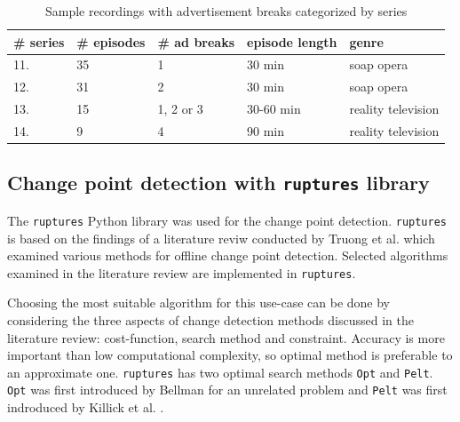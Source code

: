 \begin{table}[h]
    \begin{center}
    \begin{tabular}{|p{15mm}|p{20mm}|p{22mm}|p{28mm}|p{30mm}|} %
        \hline
        \textbf{\# series} & \textbf{\# episodes} & \textbf{\# ad breaks} & \textbf{episode length} & \textbf{genre}  \\ \hline
        11. & 35 & 1 & 30 min & soap opera\\ \hline
        12. & 31 & 2 & 30 min & soap opera\\ \hline
        13. & 15 & 1, 2 or 3 & 30-60 min & reality television\\ \hline
        14. &  9 & 4 & 90 min & reality television\\ \hline
    \end{tabular}
    \end{center}
    \caption{Sample recordings with advertisement breaks categorized by series}
    \label{tab:data_ads}
\end{table}

\subsection{Change point detection with \texttt{ruptures} library} \label{subsec:solution}

The \texttt{ruptures} Python library was used for the change point detection. \texttt{ruptures} is based on the findings of a literature reviw conducted by Truong et al. \cite{truongSelectiveReviewOffline2020} which examined various methods for offline change point detection. Selected algorithms examined in the literature review are implemented in \texttt{ruptures}.

Choosing the most suitable algorithm %
for this use-case can be done by considering the three aspects of change detection methods discussed in the literature review: cost-function, search method and constraint. Accuracy is more important than low computational complexity, so optimal method is preferable to an approximate one. \texttt{ruptures} has two optimal search methods \texttt{Opt} and \texttt{Pelt}. %
\texttt{Opt} was first introduced by Bellman \cite{bellmanRoutingProblem1958} for an unrelated problem and \texttt{Pelt} was first indroduced by Killick et al. \cite{killickOptimalDetectionChangepoints2012}. 

